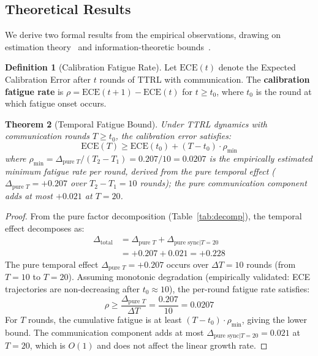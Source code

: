 \documentclass[11pt]{article}
\newcommand{\ECE}{\ensuremath{\mathrm{ECE}}}
\newtheorem{theorem}{Theorem}
\theoremstyle{definition}
\newtheorem{definition}[theorem]{Definition}
\theoremstyle{remark}
\begin{document}
\subsection{Theoretical Results}

We derive two formal results from the empirical observations, drawing on estimation theory~\citep{lehmann1998theory} and information-theoretic bounds~\citep{cover2012elements}.

\begin{definition}[Calibration Fatigue Rate]
Let $\ECE(t)$ denote the Expected Calibration Error after $t$ rounds of TTRL with communication. The \textbf{calibration fatigue rate} is $\rho = \ECE(t+1) - \ECE(t)$ for $t \geq t_0$, where $t_0$ is the round at which fatigue onset occurs.
\end{definition}

\begin{theorem}[Temporal Fatigue Bound]\label{thm:fatigue}
Under TTRL dynamics with communication rounds $T \geq t_0$, the calibration error satisfies:
\begin{equation}
    \ECE(T) \geq \ECE(t_0) + (T - t_0) \cdot \rho_{\min}
\end{equation}
where $\rho_{\min} = \Delta_{\text{pure } T}/(T_2 - T_1) = 0.207/10 = 0.0207$ is the empirically estimated minimum fatigue rate per round, derived from the pure temporal effect ($\Delta_{\text{pure } T} = +0.207$ over $T_2 - T_1 = 10$ rounds); the pure communication component adds at most $+0.021$ at $T{=}20$.
\end{theorem}

\begin{proof}
From the pure factor decomposition (Table~\ref{tab:decomp}), the temporal effect decomposes as:
\begin{align}
    \Delta_{\text{total}} &= \Delta_{\text{pure } T} + \Delta_{\text{pure sync}|T=20} \\
    &= +0.207 + 0.021 = +0.228
\end{align}
The pure temporal effect $\Delta_{\text{pure } T} = +0.207$ occurs over $\Delta T = 10$ rounds (from $T{=}10$ to $T{=}20$). Assuming monotonic degradation (empirically validated: ECE trajectories are non-decreasing after $t_0 \approx 10$), the per-round fatigue rate satisfies:
\begin{equation}
    \rho \geq \frac{\Delta_{\text{pure } T}}{\Delta T} = \frac{0.207}{10} = 0.0207
\end{equation}
For $T$ rounds, the cumulative fatigue is at least $(T - t_0) \cdot \rho_{\min}$, giving the lower bound. The communication component adds at most $\Delta_{\text{pure sync}|T=20} = 0.021$ at $T{=}20$, which is $O(1)$ and does not affect the linear growth rate.
\end{proof}
\end{document}
